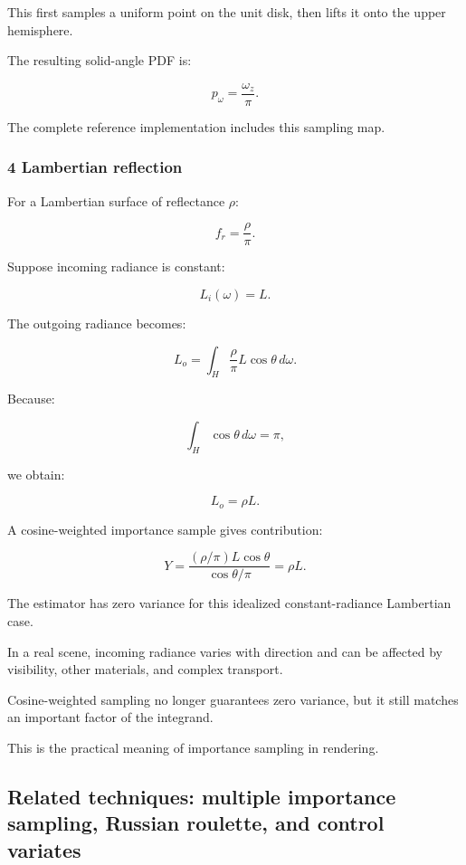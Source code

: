 This first samples a uniform point on the unit disk, then lifts it onto the upper hemisphere.

The resulting solid-angle PDF is:

\[
 \boxed{ p_\omega=\frac{\omega_z}{\pi} }.
\]

The complete reference implementation includes this sampling map.

\subsubsection{4 Lambertian reflection}\label{02-foundations-ii-ch031-lambertian-reflection}

\hypertarget{02-foundations-ii-ch031-lambertian-reflection}{}

For a Lambertian surface of reflectance \(\rho\):

\[
 f_r=\frac\rho\pi.
\]

Suppose incoming radiance is constant:

\[
 L_i(\omega)=L.
\]

The outgoing radiance becomes:

\[
 L_o= \int_H \frac\rho\pi L\cos\theta\,d\omega.
\]

Because:

\[
 \int_H\cos\theta\,d\omega=\pi,
\]

we obtain:

\[
 \boxed{L_o=\rho L}.
\]

A cosine-weighted importance sample gives contribution:

\[
 Y= \frac{ (\rho/\pi)L\cos\theta }{ \cos\theta/\pi } =\rho L.
\]

The estimator has zero variance for this idealized constant-radiance Lambertian case.

In a real scene, incoming radiance varies with direction and can be affected by visibility, other materials, and complex transport.

Cosine-weighted sampling no longer guarantees zero variance, but it still matches an important factor of the integrand.

This is the practical meaning of importance sampling in rendering.

\subsection{Related techniques: multiple importance sampling, Russian roulette, and control variates}\label{02-foundations-ii-ch031-related-techniques-multiple-importance-sampling-russian-roulette-and-control-variates}

